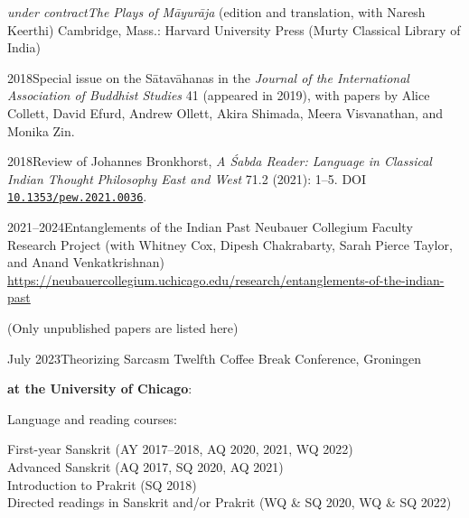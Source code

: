 \documentclass{scrartcl}
\begin{document}
\begin{entrylist}
{\emph{under contract}}{\emph{The Plays of Māyurāja} (edition and translation, with Naresh Keerthi)}
{Cambridge, Mass.: Harvard University Press (Murty Classical Library of India)}
\end{entrylist}

\sectionline

\begin{entrylist}
\singleentry
{2018}{Special issue on the Sātavāhanas in the \emph{Journal of the International Association of Buddhist Studies} 41 (appeared in 2019), with papers by Alice Collett, David Efurd, Andrew Ollett, Akira Shimada, Meera Visvanathan, and Monika Zin.}
\end{entrylist}

\begin{entrylist}
{2018}{Review of Johannes Bronkhorst, \emph{A Śabda Reader: Language in Classical Indian Thought}}
{\emph{Philosophy East and West} 71.2 (2021): 1–5. DOI \href{https://doi.org/10.1353/pew.2021.0036}{\texttt{10.1353/pew.2021.0036}}.}
\end{entrylist}

\sectionline


\begin{entrylist}
{2021–2024}{Entanglements of the Indian Past}
{Neubauer Collegium Faculty Research Project (with Whitney Cox, Dipesh Chakrabarty, Sarah Pierce Taylor, and Anand Venkatkrishnan)\\
\url{https://neubauercollegium.uchicago.edu/research/entanglements-of-the-indian-past}}
\end{entrylist} 

\sectionline

(Only unpublished papers are listed here)
\begin{entrylist}
{July 2023}{Theorizing Sarcasm}
{Twelfth Coffee Break Conference, Groningen}
\end{entrylist}

\sectionline


\textbf{at the University of Chicago}:\vspace{1ex}

\quad\begin{minipage}{0.9\textwidth}
Language and reading courses:\vspace{1ex}

\quad\begin{minipage}{0.9\textwidth}
First-year Sanskrit (AY 2017–2018, AQ 2020, 2021, WQ 2022)\\[.5ex]
Advanced Sanskrit (AQ 2017, SQ 2020, AQ 2021)\\[.5ex]
Introduction to Prakrit (SQ 2018)\\[.5ex]
Directed readings in Sanskrit and/or Prakrit (WQ \& SQ 2020, WQ \& SQ 2022)\\
\end{minipage}
\end{minipage}\vspace{-.75ex}
\end{document}
